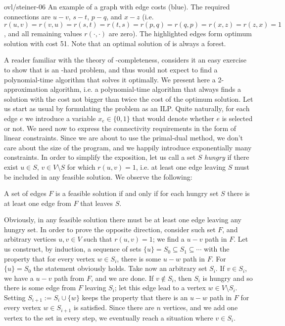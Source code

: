 \begin{myfig}{\textwidth}{ovl/steiner-06}
  An example of a graph with edge costs (blue). The required connections are  $u-v$, $s-t$, $p-q$,
  and $x-z$ (i.e.  $r(u,v)=r(v,u)=r(s,t)=r(t,s)=r(p,q)=r(q,p)=r(x,z)=r(z,x)=1$, and all remaining
  values $r(\cdot,\cdot)$ are zero). The highlighted edges form optimum solution with cost 51.  Note 
  that an optimal solution of \minsforest is always a forest.
\end{myfig}

\noindent
A reader familiar with the theory of \NP-completeness, considers it an easy exercise to show that \minsforest
is an \NP-hard problem, and thus would not expect to find a polynomial-time algorithm that solves it 
optimally. We present here a 2-approximation algorithm, i.e. a polynomial-time algorithm that
always finds a solution with the cost not bigger than twice the cost of the optimum solution.
Let us start as usual by formulating the problem as an ILP. Quite naturally, for each edge $e$ we 
introduce a variable $x_e\in\{0,1\}$ that would denote whether $e$ is selected or not. We need now
to express the connectivity requirements in the form of linear constraints. Since we are about to use the
primal-dual method, we don't care about the size of the program, and we happily introduce exponentially many 
constraints. In order to simplify the exposition, let us call a set $S$ {\em hungry} if there 
exist $u\in S$, $v\in V\setminus S$ for which $r(u,v)=1$, i.e. at least one edge leaving $S$ must be 
included in any feasible solution. We observe the following:

\begin{lema}
  A set of edges $F$ is a feasible solution if and only if for each hungry set $S$ there is at least one edge 
  from $F$ that leaves $S$.
\end{lema}

\begin{dokaz}
  Obviously, in any feasible solution there must be at least one edge leaving any hungry set. 
  In order to prove the opposite direction, consider such set $F$, and arbitrary vertices $u,v\in V$ such that
  $r(u,v)=1$; we find a $u-v$ path in $F$. Let us construct, by induction, a sequence of sets  
  $\{u\}=S_0\subseteq S_1\subseteq\cdots$ with the property that for every vertex $w\in S_i$, there is
  some  $u-w$ path in $F$. For  $\{u\}=S_0$ the statement obviously holds. Take now
  an arbitrary set  $S_i$. If  $v\in S_i$, we have a $u-v$ path from $F$, and we are done. If
   $v\not\in S_i$, then $S_i$ is hungry and so there is some edge from $F$ leaving $S_i$; let this
   edge lead to a vertex  $w\in V\setminus S_i$. Setting $S_{i+1}:=S_i\cup\{w\}$ keeps the property
   that there is an $u-w$ path in $F$ for every vertex $w\in S_{i+1}$ is satisfied.
   Since there are $n$ vertices, and we add one vertex to the set in every step, we eventually reach
   a situation where $v\in S_i$.
\end{dokaz}

